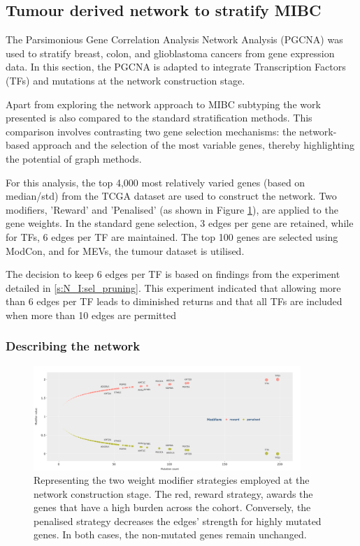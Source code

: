 


\subsection{Tumour derived network to stratify MIBC} \label{s:N_I:tum}


The Parsimonious Gene Correlation Analysis Network Analysis (PGCNA) was used to stratify breast, colon, and glioblastoma cancers \cite{Care2019-ij,Tanner2023-wa} from gene expression data. In this section, the PGCNA is adapted to integrate Transcription Factors (TFs) and mutations at the network construction stage. 

Apart from exploring the network approach to MIBC subtyping the work presented is also compared to the standard stratification methods. This comparison involves contrasting two gene selection mechanisms: the network-based approach and the selection of the most variable genes, thereby highlighting the potential of graph methods.

For this analysis, the top 4,000 most relatively varied genes (based on median/std) from the TCGA dataset are used to construct the network. Two modifiers, 'Reward' and 'Penalised' (as shown in Figure \ref{fig:N_I:modifiers}), are applied to the gene weights. In the standard gene selection, 3 edges per gene are retained, while for TFs, 6 edges per TF are maintained. The top 100 genes are selected using ModCon, and for MEVs, the tumour dataset is utilised.

The decision to keep 6 edges per TF is based on findings from the experiment detailed in \cref{s:N_I:sel_pruning}. This experiment indicated that allowing more than 6 edges per TF leads to diminished returns and that all TFs are included when more than 10 edges are permitted

\subsubsection{Describing the network} \label{s:N_I:tum_describe}

\begin{figure}[!htb]    \centering\includegraphics[width=0.9\textwidth,keepaspectratio]{Sections/Network_I/Resources/Methods/modifiers.png}
    \caption{Representing the two weight modifier strategies employed at the network construction stage. The red, reward strategy, awards the genes that have a high burden across the cohort. Conversely, the  penalised strategy decreases the edges' strength for highly mutated genes. In both cases, the non-mutated genes remain unchanged.}
    \label{fig:N_I:modifiers}
\end{figure}


